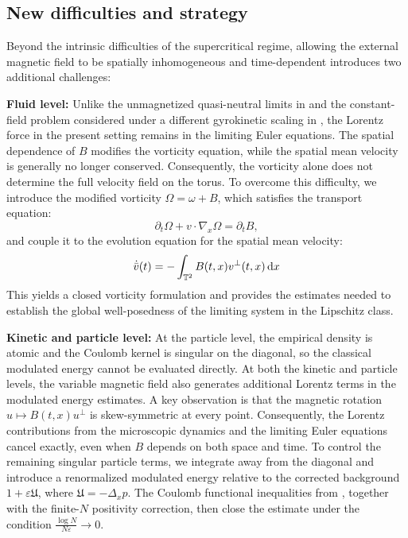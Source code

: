 \documentclass[11pt,reqno]{amsart}
\numberwithin{equation}{section}
\def\dd{{\rm d}}
\begin{document}
\subsection{New difficulties and strategy} 
Beyond the intrinsic difficulties of the supercritical regime, 
allowing the external magnetic field to be spatially inhomogeneous and time-dependent 
introduces two additional challenges:

\smallskip
\noindent\textbf{Fluid level:}
Unlike the unmagnetized quasi-neutral limits in \cite{brenier1994limite,brenier2000convergence} 
and the constant-field problem considered under a different gyrokinetic scaling 
in \cite{golse2003vlasov}, the Lorentz force in the present setting remains 
in the limiting Euler equations. 
The spatial dependence of $B$ modifies the vorticity equation, while the spatial mean velocity 
is generally no longer conserved. 
Consequently, the vorticity alone does not determine the full velocity field on the torus. 
To overcome this difficulty, we introduce the modified vorticity $\Omega=\omega+B$, 
which satisfies the transport equation:
$$
\partial_t\Omega+v\cdot\nabla_x\Omega=\partial_tB,
$$
and couple it to the evolution equation for the spatial mean velocity:
$$
\dot{\bar v}(t)=-\int_{\mathbb T^2}B(t,x)v^\perp(t,x)\,\dd x
$$
 This yields a closed vorticity formulation 
and provides the estimates needed to establish the global well-posedness 
of the limiting system in the Lipschitz class.

\smallskip
\noindent\textbf{Kinetic and particle level:}
At the particle level, the empirical density is atomic and the Coulomb kernel is singular on the diagonal, so the classical modulated energy cannot be evaluated directly.
At both the kinetic and particle levels, the variable magnetic field also generates additional 
Lorentz terms in the modulated energy estimates. A key observation is that the magnetic rotation 
$u\mapsto B(t,x)u^\perp$ is skew-symmetric at every point. Consequently, the Lorentz contributions from the microscopic dynamics and the limiting Euler equations cancel exactly, even when $B$ depends on both space and time. To control the remaining singular particle terms, we integrate away from the diagonal and introduce a renormalized modulated energy relative to the corrected background $1+\varepsilon\mathfrak{U}$, where $\mathfrak{U}=-\Delta_xp$. The Coulomb functional inequalities from \cite{duerinckx2020mean,bresch2020modulated,han2021newton}, together with the finite-$N$ positivity correction, then close the estimate under the condition
$\frac{\log N}{N\varepsilon}\to0$.
\end{document}

